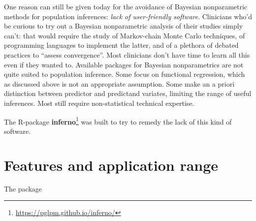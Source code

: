 \documentclass{article}
\begin{document}
One reason can still be given today for the avoidance of Bayesian nonparametric methods for population inferences: \emph{lack of user-friendly software}. Clinicians who'd be curious to try out a Bayesian nonparametric analysis of their studies simply can't: that would require the study of Markov-chain Monte Carlo techniques, of programming languages to implement the latter, and of a plethora of debated practices to ``assess convergence''. Most clinicians don't have time to learn all this even if they wanted to. Available packages for Bayesian nonparametrics are not quite suited to population inference. Some focus on functional regression, which as discussed above is not an appropriate assumption. Some make an a priori distinction between predictor and predictand variates, limiting the range of useful inferences. Most still require non-statistical technical expertise.

\medskip

The R-package \textbf{inferno}\footnote{\url{https://pglpm.github.io/inferno/}} was built to try to remedy the lack of this kind of software.

\section{Features and application range}
\label{sec:features}

The package





\citep{walker2010}



\end{document}
